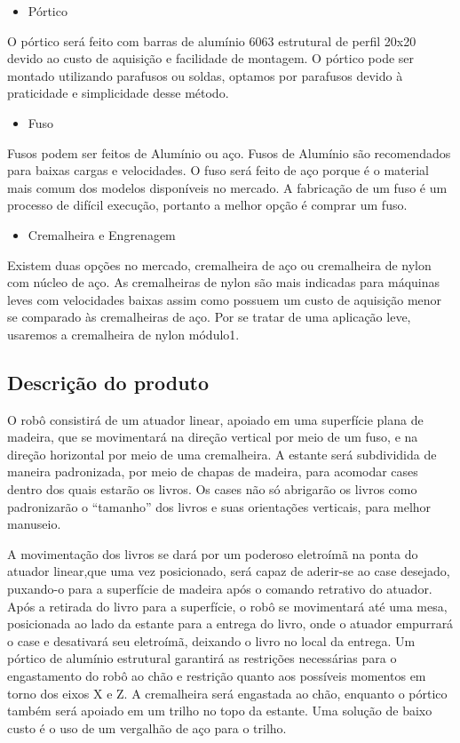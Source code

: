 \begin{itemize}
\item{Pórtico}
\end{itemize}

O pórtico será feito com barras de alumínio 6063 estrutural de perfil 20x20 devido ao custo de aquisição e facilidade de montagem. O pórtico pode ser montado utilizando parafusos ou soldas, optamos por parafusos devido à praticidade e simplicidade desse método.

\begin{itemize}
\item{Fuso}
\end{itemize}

Fusos podem ser feitos de Alumínio ou aço. Fusos de Alumínio são recomendados para  baixas cargas e velocidades. O fuso será feito de aço porque é o material mais comum dos modelos disponíveis no mercado. A fabricação de um fuso é um processo de difícil execução, portanto a melhor opção é comprar um fuso.

\begin{itemize}
\item{Cremalheira e Engrenagem}
\end{itemize}

Existem duas opções no mercado, cremalheira de aço ou cremalheira de nylon com núcleo de aço. As cremalheiras de nylon são mais indicadas para máquinas leves com velocidades baixas assim como possuem um custo de aquisição menor se comparado às cremalheiras de aço. Por se tratar de uma aplicação leve, usaremos a cremalheira de nylon módulo1.

\subsection{Descrição do produto}

O robô consistirá de um atuador linear, apoiado em uma superfície plana de madeira, que se movimentará na direção vertical por meio de um fuso, e na direção horizontal por meio de uma cremalheira. A estante será subdividida de maneira padronizada, por meio de chapas de madeira, para acomodar cases dentro dos quais estarão os livros. Os cases não só abrigarão os livros como padronizarão o “tamanho” dos livros e suas orientações verticais, para melhor manuseio.

 A movimentação dos livros se dará por um poderoso eletroímã na ponta do atuador linear,que uma vez posicionado, será capaz de aderir-se ao case desejado, puxando-o para a superfície de madeira após o comando retrativo do atuador. Após a retirada do livro para a superfície, o robô se movimentará até uma mesa, posicionada ao lado da estante para a entrega do livro, onde o atuador empurrará o case e desativará seu eletroímã, deixando o livro no local da entrega. Um pórtico de alumínio estrutural garantirá as restrições necessárias para o engastamento do robô ao chão e restrição quanto aos possíveis momentos em torno dos eixos X e Z. A cremalheira será engastada ao chão, enquanto o pórtico também será apoiado em um trilho no topo da estante. Uma solução de baixo custo é o uso de um vergalhão de aço para o trilho.

